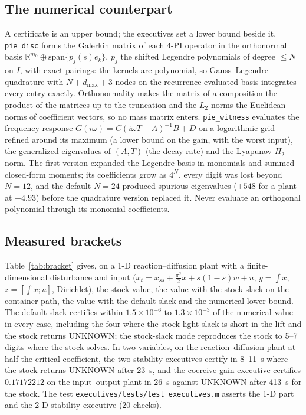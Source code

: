 \documentclass[12pt]{article}
\newcommand{\R}{\mathbb{R}}
\newcommand{\mrm}[1]{\mathrm{#1}}
\newcommand{\code}[1]{\texttt{#1}}
\theoremstyle{plain}
\theoremstyle{definition}
\theoremstyle{remark}
\begin{document}
\subsection{The numerical counterpart}\label{sec:witness}

A certificate is an upper bound; the executives set a lower bound beside it. \code{pie\_disc} forms the Galerkin matrix of each 4-PI operator in the orthonormal basis $\R^{m_0}\oplus\mrm{span}\{p_j(s)e_k\}$, $p_j$ the shifted Legendre polynomials of degree $\le N$ on $I$, with exact pairings: the kernels are polynomial, so Gauss--Legendre quadrature with $N+d_{\max}+3$ nodes on the recurrence-evaluated basis integrates every entry exactly. Orthonormality makes the matrix of a composition the product of the matrices up to the truncation and the $L_2$ norms the Euclidean norms of coefficient vectors, so no mass matrix enters. \code{pie\_witness} evaluates the frequency response $G(i\omega)=C(i\omega T-A)^{-1}B+D$ on a logarithmic grid refined around its maximum (a lower bound on the gain, with the worst input), the generalized eigenvalues of $(A,T)$ (the decay rate) and the Lyapunov $H_2$ norm. The first version expanded the Legendre basis in monomials and summed closed-form moments; its coefficients grow as $4^N$, every digit was lost beyond $N=12$, and the default $N=24$ produced spurious eigenvalues ($+548$ for a plant at $-4.93$) before the quadrature version replaced it. Never evaluate an orthogonal polynomial through its monomial coefficients.

\subsection{Measured brackets}

Table~\ref{tab:bracket} gives, on a 1-D reaction--diffusion plant with a finite-dimensional disturbance and input ($x_t=x_{ss}+\tfrac{\pi^2}{2}x+s(1-s)w+u$, $y=\int x$, $z=[\int x;u]$, Dirichlet), the stock value, the value with the stock slack on the container path, the value with the default slack and the numerical lower bound. The default slack certifies within $1.5\times10^{-6}$ to $1.3\times10^{-3}$ of the numerical value in every case, including the four where the stock light slack is short in the lift and the stock returns UNKNOWN; the stock-slack mode reproduces the stock to 5--7 digits where the stock solves. In two variables, on the reaction--diffusion plant at half the critical coefficient, the two stability executives certify in 8--11~s where the stock returns UNKNOWN after 23~s, and the coercive gain executive certifies $0.17172212$ on the input--output plant in 26~s against UNKNOWN after 413~s for the stock. The test \code{executives/tests/test\_executives.m} asserts the 1-D part and the 2-D stability executive (20 checks).
\end{document}
